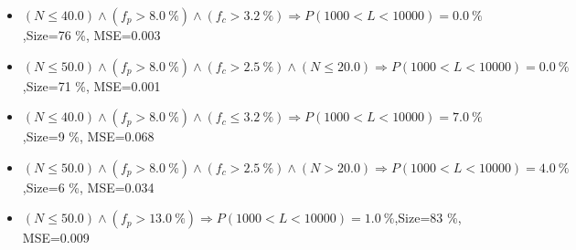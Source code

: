 \documentclass[numbered]{CSL}
\begin{document}
\begin{itemize}
\item $(N \leq 40.0) \land (f_p > 8.0~\%) \land (f_c > 3.2~\%) \Rightarrow P(1 000 < L < 10 000) = 0.0~\%$,\hfill Size=76 \%, MSE=0.003
\item $(N \leq 50.0) \land (f_p > 8.0~\%) \land (f_c > 2.5~\%) \land (N \leq 20.0) \Rightarrow P(1 000 < L < 10 000) = 0.0~\%$,\hfill Size=71 \%, MSE=0.001
\item $(N \leq 40.0) \land (f_p > 8.0~\%) \land (f_c \leq 3.2~\%) \Rightarrow P(1 000 < L < 10 000) = 7.0~\%$,\hfill Size=9 \%, MSE=0.068
\item $(N \leq 50.0) \land (f_p > 8.0~\%) \land (f_c > 2.5~\%) \land (N > 20.0) \Rightarrow P(1 000 < L < 10 000) = 4.0~\%$,\hfill Size=6 \%, MSE=0.034
\item $(N \leq 50.0) \land (f_p > 13.0~\%) \Rightarrow P(1 000 < L < 10 000) = 1.0~\%$,\hfill Size=83 \%, MSE=0.009
\end{itemize}
\end{document}
